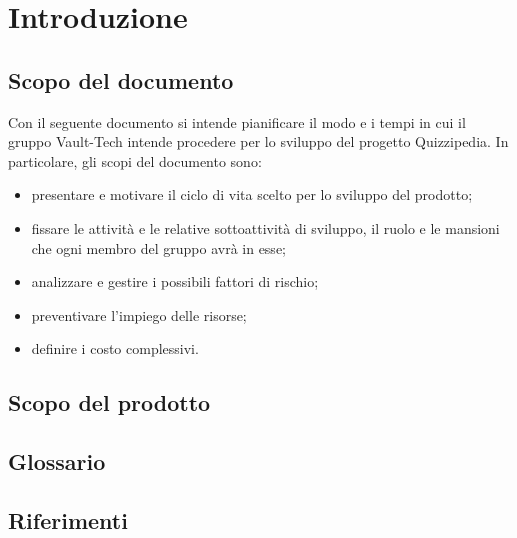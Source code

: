 \documentclass[a4paper, titlepage]{article}
\begin{document}
	
	\pagestyle{fancy}	
	
	\maketitle
	
	
	
	\newpage
	\tableofcontents
	\newpage
	\listoffigures
	\newpage
	\listoftables\label{lastromanpage}
	
	\newpage
	\clearpage	
	\hypersetup{linkcolor=blue}
	
	\section{Introduzione}
	\subsection{Scopo del documento}
	Con il seguente documento si intende pianificare il modo e i tempi in cui il gruppo Vault-Tech intende procedere per lo sviluppo del progetto Quizzipedia.
	In particolare, gli scopi del documento sono:
	\begin{itemize}
		\item presentare e motivare il ciclo di vita scelto per lo sviluppo del prodotto;
		\item fissare le attività e le relative sottoattività di sviluppo, il ruolo e le mansioni che ogni membro del gruppo avrà in esse;
		\item analizzare e gestire i possibili fattori di rischio;
		\item preventivare l'impiego delle risorse;
		\item definire i costo complessivi.
	\end{itemize}
	
	
	\subsection{Scopo del prodotto}
	\SCOPO
	
	\subsection{Glossario}
	\GLOSSARIO
	\subsection{Riferimenti}
\end{document}
